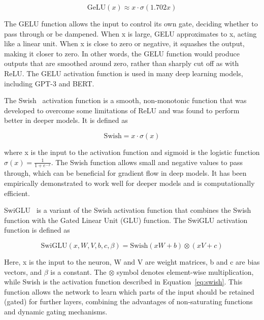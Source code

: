 \begin{equation}
	\text{GeLU}(x) \approx x \cdot \sigma(1.702x)
	\label{eq:geluapprox2}
\end{equation}

The GELU function allows the input to control its own gate, deciding whether to pass through or be dampened.
When x is large, GELU approximates to x, acting like a linear unit.
When x is close to zero or negative, it squashes the output, making it closer to zero.
In other words, the GELU function would produce outputs that are smoothed around zero, rather than sharply cut off as with ReLU\@.
The GELU activation function is used in many deep learning models, including GPT-3 and BERT\@.

The Swish~\cite{ramachandran2017searching} activation function is a smooth, non-monotonic function that was developed to overcome some limitations of ReLU and was found to perform better in deeper models.
It is defined as

\begin{equation}
	\text{Swish} = x \cdot \sigma\left(x\right)
	\label{eq:swish}
\end{equation}

\noindent where x is the input to the activation function and sigmoid is the logistic function \(\sigma(x) = \frac{1}{1+e^{-x}}\).
The Swish function allows small and negative values to pass through, which can be beneficial for gradient flow in deep models.
It has been empirically demonstrated to work well for deeper models and is computationally efficient.

SwiGLU~\cite{shazeer2020glu} is a variant of the Swish activation function that combines the Swish function with the Gated Linear Unit (GLU) function.
The SwiGLU activation function is defined as

\begin{equation}
	\text{SwiGLU}\left(x, W, V, b, c, \beta\right) = \text{Swish}\left(xW + b\right) \otimes \left(xV + c\right)
	\label{eq:swiglu}
\end{equation}

\noindent Here, x is the input to the neuron, W and V are weight matrices, b and c are bias vectors, and $\beta$ is a constant.
The $\otimes$ symbol denotes element-wise multiplication, while Swish is the activation function described in Equation~\ref{eq:swish}.
This function allows the network to learn which parts of the input should be retained (gated) for further layers, combining the advantages of non-saturating functions and dynamic gating mechanisms.


